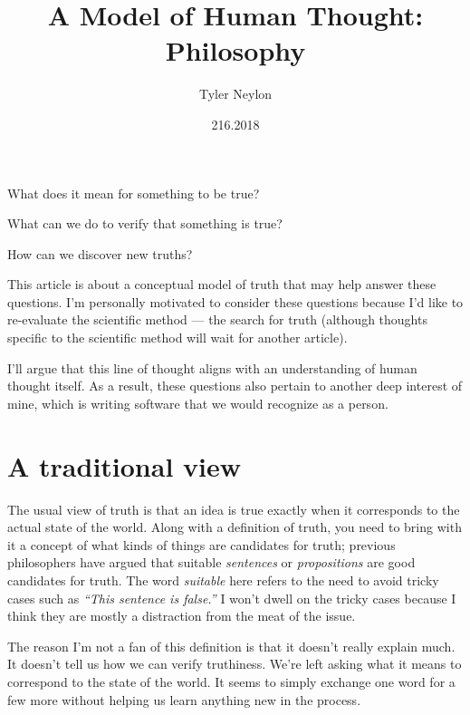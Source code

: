 \documentclass[20pt,]{extarticle}
\title{A Model of Human Thought: Philosophy}
\author{Tyler Neylon}
\date{216.2018}
\newcommand{\class}[1]{}
\newcommand{\optquad}{\quad}
\newcommand{\smallscrneg}{}
\newcommand{\smallscr}[1]{}
\newcommand{\bigscr}[1]{#1}
\newcommand{\smallscrskip}[1]{}
\begin{document}
\maketitle

\newcommand{\R}{\mathbb{R}}
\newcommand{\Z}{\mathbb{Z}}
\newcommand{\eqnset}[1]{\left.\mbox{$#1$}\;\;\right\rbrace\class{postbrace}{ }}
\providecommand{\optquad}{\class{optquad}{}}
\providecommand{\smallscrneg}{\class{smallscrneg}{ }}
\providecommand{\bigscr}[1]{\class{bigscr}{#1}}
\providecommand{\smallscr}[1]{\class{smallscr}{#1}}
\providecommand{\smallscrskip}[1]{\class{smallscrskip}{\hskip #1}}

What does it mean for something to be true?

What can we do to verify that something is true?

How can we discover new truths?

This article is about a conceptual model of truth that may help answer
these questions. I'm personally motivated to consider these questions
because I'd like to re-evaluate the scientific method --- the search for
truth (although thoughts specific to the scientific method will wait for
another article).

I'll argue that this line of thought aligns with an understanding of
human thought itself. As a result, these questions also pertain to
another deep interest of mine, which is writing software that we would
recognize as a person.

\section{A traditional view}\label{a-traditional-view}

The usual view of truth is that an idea is true exactly when it
corresponds to the actual state of the world. Along with a definition of
truth, you need to bring with it a concept of what kinds of things are
candidates for truth; previous philosophers have argued that suitable
\emph{sentences} or \emph{propositions} are good candidates for truth.
The word \emph{suitable} here refers to the need to avoid tricky cases
such as \emph{``This sentence is false.''} I won't dwell on the tricky
cases because I think they are mostly a distraction from the meat of the
issue.

The reason I'm not a fan of this definition is that it doesn't really
explain much. It doesn't tell us how we can verify truthiness. We're
left asking what it means to correspond to the state of the world. It
seems to simply exchange one word for a few more without helping us
learn anything new in the process.
\end{document}
